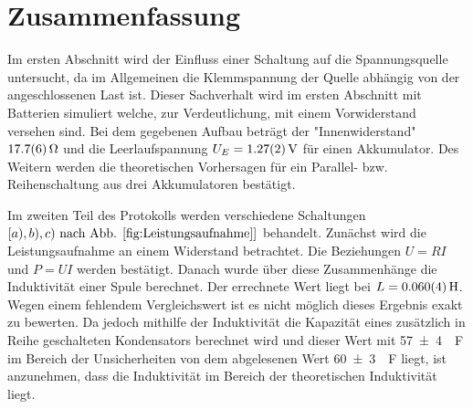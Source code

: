 
\section{Zusammenfassung}
Im ersten Abschnitt wird der Einfluss einer Schaltung auf die Spannungsquelle untersucht, da im Allgemeinen die Klemmspannung der Quelle abhängig von der angeschlossenen Last ist. Dieser Sachverhalt wird im ersten Abschnitt mit Batterien simuliert welche, zur Verdeutlichung, mit einem Vorwiderstand versehen sind. Bei dem gegebenen Aufbau beträgt der "Innenwiderstand" $\SI{17.7+-0.6}{\ohm}$ und die Leerlaufspannung $U_E=\SI{1.27+-0.02}{V}$ für einen Akkumulator. Des Weitern werden die theoretischen Vorhersagen für ein Parallel- bzw. Reihenschaltung aus drei Akkumulatoren bestätigt.

Im zweiten Teil des Protokolls werden verschiedene Schaltungen  $\left[ a),b),c)  \text{ nach Abb. \ref{fig:Leistungsaufnahme}} \right]$ behandelt.
Zunächst wird die Leistungsaufnahme an einem Widerstand betrachtet. Die Beziehungen $U=RI$ und $P=UI$ werden bestätigt.
Danach wurde über diese Zusammenhänge die Induktivität einer Spule berechnet.
Der errechnete Wert liegt bei $L= \SI{0,060+-0,004}{H}$. Wegen einem fehlendem Vergleichswert ist es nicht möglich dieses Ergebnis exakt zu bewerten. 
Da jedoch  mithilfe der Induktivität die Kapazität eines zusätzlich in Reihe geschalteten Kondensators berechnet wird und dieser Wert mit \SI{57+-4}{\mu F} im Bereich der Unsicherheiten von dem abgelesenen Wert \SI{60+-3}{\mu F} liegt, ist anzunehmen, dass die Induktivität im Bereich der theoretischen Induktivität liegt.






